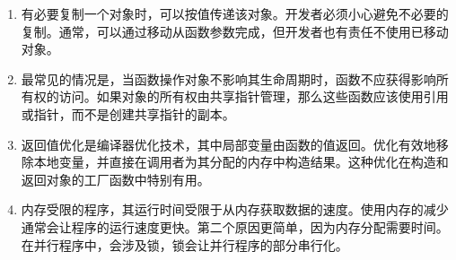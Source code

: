 \begin{enumerate}
\item 
有必要复制一个对象时，可以按值传递该对象。开发者必须小心避免不必要的复制。通常，可以通过移动从函数参数完成，但开发者也有责任不使用已移动对象。

\item 
最常见的情况是，当函数操作对象不影响其生命周期时，函数不应获得影响所有权的访问。如果对象的所有权由共享指针管理，那么这些函数应该使用引用或指针，而不是创建共享指针的副本。

\item 
返回值优化是编译器优化技术，其中局部变量由函数的值返回。优化有效地移除本地变量，并直接在调用者为其分配的内存中构造结果。这种优化在构造和返回对象的工厂函数中特别有用。

\item
内存受限的程序，其运行时间受限于从内存获取数据的速度。使用内存的减少通常会让程序的运行速度更快。第二个原因更简单，因为内存分配需要时间。在并行程序中，会涉及锁，锁会让并行程序的部分串行化。

\end{enumerate}